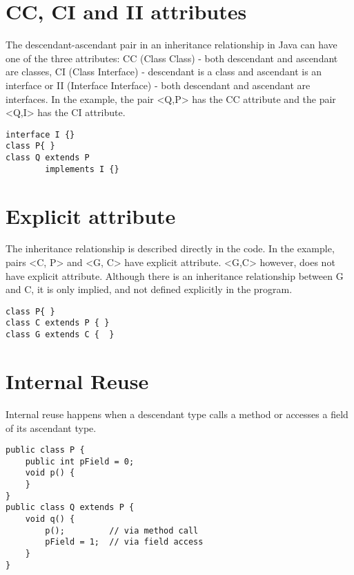 \documentclass{uvamscse}
\begin{document}
\section{CC, CI and II attributes}
\begin{multicols}{2}
The descendant-ascendant pair in an inheritance relationship in Java can have one of the three attributes: CC (Class Class) - both descendant and ascendant are classes, CI (Class Interface) - descendant is a class and ascendant is an interface or II (Interface Interface) - both descendant and ascendant are interfaces. In the example, the pair <Q,P> has the CC attribute and the pair <Q,I> has the CI attribute.
\columnbreak
\begin{verbatim}
interface I {}
class P{ }
class Q extends P 
        implements I {}  
\end{verbatim}
\end{multicols}


\section{Explicit attribute}
\begin{multicols}{2}
The inheritance relationship is described directly in the code. In the example, pairs <C, P> and <G, C> have explicit attribute. <G,C> however, does not have explicit attribute. Although there is an inheritance relationship between G and C, it is only implied, and not defined explicitly in the program.
\columnbreak
\begin{verbatim}
class P{ }
class C extends P { } 
class G extends C {  } 
\end{verbatim}
\end{multicols}




\section{Internal Reuse}
\begin{multicols}{2}
Internal reuse happens when a descendant type calls a method or accesses a field of its ascendant type. 
\columnbreak
\begin{verbatim}
public class P {
    public int pField = 0;
    void p() {
    }
}
public class Q extends P {
    void q() {
        p();         // via method call
        pField = 1;  // via field access
    }
}
\end{verbatim}
\end{multicols}
\end{document}
